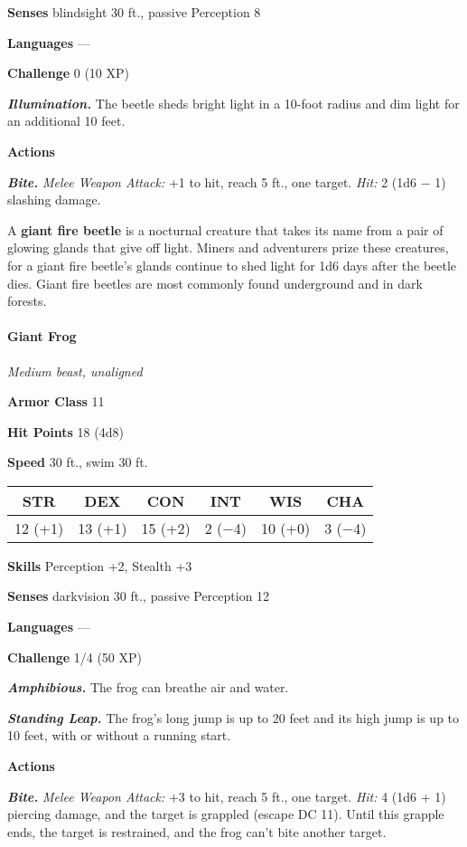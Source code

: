 \documentclass[
]{article}
\begin{document}
\textbf{Senses} blindsight 30 ft., passive Perception 8

\textbf{Languages} ---

\textbf{Challenge} 0 (10 XP)

\emph{\textbf{Illumination.}} The beetle sheds bright light in a 10-foot
radius and dim light for an additional 10 feet.

\textbf{Actions}

\emph{\textbf{Bite.}} \emph{Melee Weapon Attack:} +1 to hit, reach 5
ft., one target. \emph{Hit:} 2 (1d6 − 1) slashing damage.

A \textbf{giant fire beetle} is a nocturnal creature that takes its name
from a pair of glowing glands that give off light. Miners and
adventurers prize these creatures, for a giant fire beetle's glands
continue to shed light for 1d6 days after the beetle dies. Giant fire
beetles are most commonly found underground and in dark forests.

\hypertarget{giant-frog}{%
\paragraph{Giant Frog}\label{giant-frog}}

\emph{Medium beast, unaligned}

\textbf{Armor Class} 11

\textbf{Hit Points} 18 (4d8)

\textbf{Speed} 30 ft., swim 30 ft.

\begin{longtable}[]{@{}cccccc@{}}
\toprule
STR & DEX & CON & INT & WIS & CHA\tabularnewline
\midrule
\endhead
12 (+1) & 13 (+1) & 15 (+2) & 2 (−4) & 10 (+0) & 3 (−4)\tabularnewline
\bottomrule
\end{longtable}

\textbf{Skills} Perception +2, Stealth +3

\textbf{Senses} darkvision 30 ft., passive Perception 12

\textbf{Languages} ---

\textbf{Challenge} 1/4 (50 XP)

\emph{\textbf{Amphibious.}} The frog can breathe air and water.

\emph{\textbf{Standing Leap.}} The frog's long jump is up to 20 feet and
its high jump is up to 10 feet, with or without a running start.

\textbf{Actions}

\emph{\textbf{Bite.}} \emph{Melee Weapon Attack:} +3 to hit, reach 5
ft., one target. \emph{Hit:} 4 (1d6 + 1) piercing damage, and the target
is grappled (escape DC 11). Until this grapple ends, the target is
restrained, and the frog can't bite another target.
\end{document}
